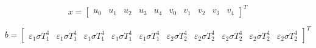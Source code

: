 
\begin{equation}
 x ={ \begin{bmatrix}
 u_0 & 
u_1 &
 u_2 &
 u_3 &
 u_4 &
 v_0 &
 v_1 &
 v_2 &
 v_3 &
 v_4 
 \end{bmatrix} }^{ T } 
 \label{eq:x}
\end{equation}

\begin{equation}
 b ={ \begin{bmatrix}
 \varepsilon_1 \sigma T_1^4 &
 \varepsilon_1 \sigma T_1^4&
 \varepsilon_1 \sigma T_1^4&
 \varepsilon_1 \sigma T_1^4&
 \varepsilon_1 \sigma T_1^4&
 \varepsilon_2 \sigma T_2^4&
 \varepsilon_2 \sigma T_2^4&
 \varepsilon_2 \sigma T_2^4&
 \varepsilon_2 \sigma T_2^4&
 \varepsilon_2 \sigma T_2^4
 \end{bmatrix} }^{ T } 
 \label{eq:b}
\end{equation}


